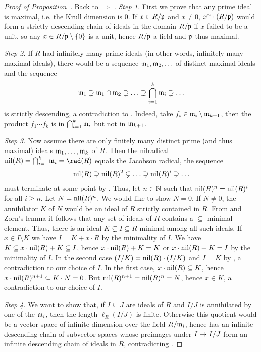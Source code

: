 \documentclass[a4paper,parskip=half,numbers=enddot, DIV=12]{scrreprt}
\begin{document}
\begin{proof}[Proof of Proposition~]
    Back to  $\Rightarrow$ . \emph{Step 1.} First we prove that any prime ideal is maximal, i.e. the Krull dimension is $0$. If $x\in R/\mathfrak{p}$ and $x\neq 0$, $x^n\cdot(R/\mathfrak{p})$ would form a strictly descending chain of ideals in the domain $R/\mathfrak{p}$ if $x$ failed to be a unit, so any $x\in R/\mathfrak{p}\setminus\{0\}$ is a unit, hence $R/\mathfrak{p}$ a field and $\mathfrak{p}$ thus maximal. 
    
    \emph{Step 2.} If $R$ had infinitely many prime ideals (in other words, infinitely many maximal ideals), there would be a sequence $\mathfrak{m}_1,\mathfrak{m}_2,\ldots$ of distinct maximal ideals and the sequence
    \begin{align*}
        \mathfrak{m}_1 \supsetneq \mathfrak{m}_1\cap\mathfrak{m}_2\supsetneq \ldots\supsetneq \bigcap_{i=1}^k \mathfrak{m}_i \supsetneq \ldots
    \end{align*}
    is strictly descending, a contradiction to . Indeed, take $f_i\in\mathfrak{m}_i\setminus \mathfrak{m}_{k+1}$, then the product $f_1\cdots f_k$ is in $\bigcap_{i=1}^k\mathfrak{m}_i$ but not in $\mathfrak{m}_{k+1}$.
    
    \emph{Step 3.} Now assume there are only finitely many distinct prime (and thus maximal) ideals $\mathfrak{m}_1, \ldots,\mathfrak{m}_k$ of $R$. Then the nilradical $\nil(R) = \bigcap_{i=1}^k \mm_i=\rad(R)$ equals the Jacobson radical, the sequence 
    \begin{align*}
    	\operatorname{nil}(R)\supsetneq\operatorname{nil}(R)^2\subsetneq \ldots\supsetneq \operatorname{nil}(R)^i\supsetneq\ldots 
    \end{align*}
    must terminate at some point by . Thus, let $n\in\mathbb{N}$ such that $\operatorname{nil}(R)^n = \operatorname{nil}(R)^i$ for all $i\geq n$. Let $N = \operatorname{nil}(R)^n$. We would like to show $N=0$. If $N\neq 0$, the annihilator $K$ of $N$ would be an ideal of $R$ strictly contained in $R$. From  and Zorn's lemma it follows that any set of ideals of $R$ contains a $\subseteq$-minimal element. Thus, there is an ideal $K\subsetneq I\subseteq R$ minimal among all such ideals. If $x\in I\setminus K$ we have $I= K+x\cdot R$ by the minimality of $I$. We have $K\subseteq x\cdot \operatorname{nil}(R) + K \subseteq I$, hence $x\cdot  \operatorname{nil}(R) + K = K$ or $x\cdot \operatorname{nil}(R) +K = I$ by the minimality of $I$. In the second case $(I/K) = \operatorname{nil}(R)\cdot(I/K)$ and $I=K$ by \NAK, a contradiction to our choice of $I$. In the first case, $x\cdot \operatorname{nil}(R) \subseteq K$, hence $x\cdot \operatorname{nil}(R)^{n+1}\subseteq K\cdot N = 0$. But $\operatorname{nil}(R)^{n+1}= \operatorname{nil}(R)^n = N$, hence $x\in K$, a contradiction to our choice of $I$. 
    
    \emph{Step 4.} We want to show that, if $I\subseteq J$ are ideals of $R$ and $I/J$ is annihilated by one of the $\mathfrak{m}_i$, then the length $\ell_R(I/J)$ is finite. Otherwise this quotient would be a vector space of infinite dimension over the field $R/\mathfrak{m}_i$, hence has an infinite descending chain of subvector spaces whose preimages under $I\morphism I/J$ form an infinite descending chain of ideals in $R$, contradicting . 
    

\end{proof}
\end{document}
